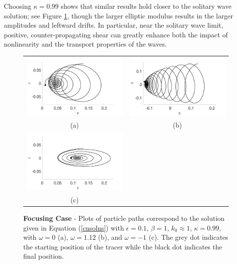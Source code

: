 \documentclass{JFM_Style/jfm}
\begin{document}
Choosing $\kappa=0.99$ shows that similar results hold closer to the solitary wave solution; see Figure \ref{fig:foc_kap_pt99}, though the larger elliptic modulus results in the larger amplitudes and leftward drifts.  In particular, near the solitary wave limit, positive, counter-propagating shear can greatly enhance both the impact of nonlinearity and the transport properties of the waves.
\begin{figure}
\centering
\begin{tabular}{cc}
\includegraphics[width=.48\textwidth]{track_ep_pt1_tf_1_w_0_kap_pt99_foc} & \includegraphics[width=.48\textwidth]{track_ep_pt1_tf_1_w_1_kap_pt99_foc} \\
(a) & (b) \\
\includegraphics[width=.48\textwidth]{track_ep_pt1_tf_1_w_n1_kap_pt99_foc} & \\
(c) &
\end{tabular}
\caption{\small {\bf Focusing Case} - Plots of particle paths correspond to the solution given in Equation (\ref{cnsolns}) with $\epsilon=0.1$, $\beta=1$, $k_{0}\approx 1$, $\kappa=0.99$, with $\omega=0$ (a), $\omega=1.12$ (b), and $\omega=-1$ (c). The grey dot indicates the starting position of the tracer while the black dot indicates the final position.}
\label{fig:foc_kap_pt99}
\end{figure}
\end{document}
